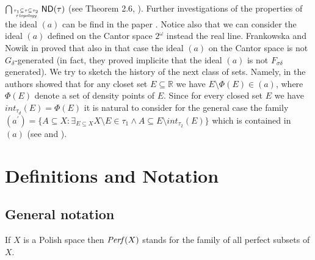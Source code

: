 \documentclass[12pt]{amsart}
\theoremstyle{plain}
\theoremstyle{definition}
\theoremstyle{remark}
\newcommand{\Perf}{{\it Perf}}
\newcommand{\real}{\mathbb{R}}
\newcommand{\mathint}{\mathit{int}}
\newcommand{\aideal}{\mathit{(a)}}
\newcommand{\aidealprime}{\mathit{(a^\prime)}}
\begin{document}
$\bigcap_{\tau_1 \subseteq \tau \subseteq \tau_2 \atop \tau \hbox{\tiny \it
topology}} \mathsf{ND}(\tau)$ (see Theorem 2.6, \cite{N}).
Further investigations of the properties of the ideal $(a)$ can be find in the paper  
\cite{FG}.
Notice also that we can consider the ideal $(a)$ defined on the Cantor
space $2^{\omega}$ instead the real line. 
Frankowska and Nowik in \cite{FN1} proved that also in that case
the ideal $\aideal$ on the Cantor space is 
not $G_{\delta}$-generated (in fact, they proved implicite that the ideal $(a)$ is not
$F_{\sigma\delta}$ generated).
  We try to sketch the history of the next class of sets. Namely, in \cite{GS}
the authors showed that for any closet set $E\subseteq \real$ we have
$E\setminus \Phi(E) \in (a)$, where $\Phi(E)$ denote a set of
density points of $E$. Since for every closed set $E$ we have
$\mathint_{\tau_d}(E) = \Phi(E)$ it is natural to consider for the
general case the family 
$\aidealprime = \lbrace A \subseteq X\colon \exists_{E \subseteq X} 
X\setminus E \in \tau_1 \wedge A \subseteq E \setminus  \mathint_{\tau_2}(E) \rbrace$
which is contained in $\aideal$ (see \cite{GS} and \cite{N}).

\section{Definitions and Notation}
\subsection{General notation}
If $X$ is a Polish space then $\Perf(X)$ 
stands for the family of all perfect subsets of $X$.
\end{document}
